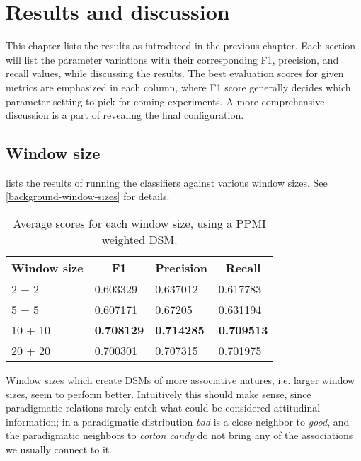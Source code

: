\chapter{Results and discussion}\label{results}

This chapter lists the results as introduced in the previous chapter. Each section will list the parameter variations with their corresponding F1, precision, and recall values, while discussing the results. The best evaluation scores for given metrics are emphasized in each column, where F1 score generally decides which parameter setting to pick for coming experiments. A more comprehensive discussion is a part of revealing the final configuration.

\section{Window size}\label{results-window-size}

 lists the results of running the classifiers against various
window sizes. See \cref{background-window-sizes} for details.

\begin{table}[H]
\centering
\begin{tabular}{llll}
\toprule
 \multicolumn{1}{c}{Window size} & \multicolumn{1}{c}{F1} & \multicolumn{1}{c}{Precision}
 & \multicolumn{1}{c}{Recall} \\
 \midrule
2 + 2           & 0.603329          & 0.637012          & 0.617783          \\
5 + 5           & 0.607171          & 0.67205           & 0.631194          \\
10 + 10         & \textbf{0.708129} & \textbf{0.714285} & \textbf{0.709513} \\
20 + 20         & 0.700301          & 0.707315          & 0.701975          \\
\bottomrule
\end{tabular}
    \caption{Average scores for each window size, using a PPMI weighted DSM.}
    \label{tbl:result-window-size}
\end{table}

Window sizes which create DSMs of more associative natures, i.e. larger window sizes, seem to perform better. Intuitively this should make sense, since paradigmatic relations rarely catch what could be considered attitudinal information; in a paradigmatic distribution \emph{bad} is a close neighbor to \emph{good}, and the paradigmatic neighbors to \emph{cotton candy} do not bring any of the associations we usually connect to it.

